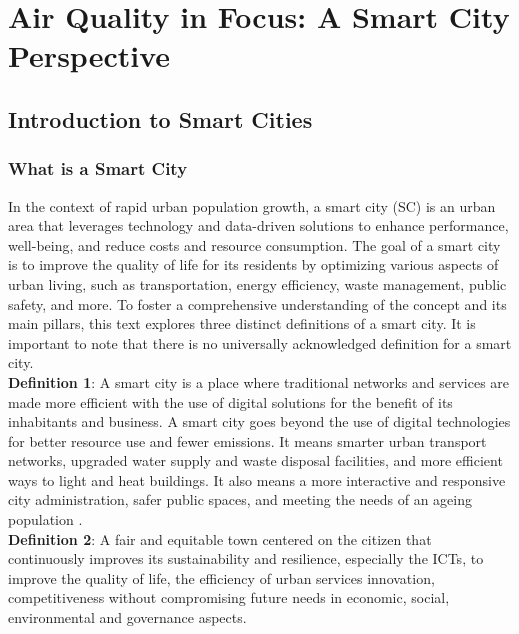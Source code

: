 \chapter{Air Quality in Focus: A Smart City Perspective}
\label{chap:OpenDatainSmartCities}

\section{Introduction to Smart Cities}
\label{sec:IntroductionSmartCities}

\subsection{What is a Smart City}

In the context of rapid urban population growth, a smart city (SC) is an urban area that leverages technology and data-driven solutions to enhance performance, well-being, and reduce costs and resource consumption. The goal of a smart city is to improve the quality of life for its residents by optimizing various aspects of urban living, such as transportation, energy efficiency, waste management, public safety, and more. 
To foster a comprehensive understanding of the concept and its main pillars, this text explores three distinct definitions of a smart city. It is important to note that there is no universally acknowledged definition for a smart city.
\\

\textbf{Definition 1}: A smart city is a place where traditional networks and services are made more efficient with the use of digital solutions for the benefit of its inhabitants and business. A smart city goes beyond the use of digital technologies for better resource use and fewer emissions. It means smarter urban transport networks, upgraded water supply and waste disposal facilities, and more efficient ways to light and heat buildings. It also means a more interactive and responsive city administration, safer public spaces, and meeting the needs of an ageing population \cite{foo1}.
\\

\textbf{Definition 2}: A fair and equitable town centered on the citizen that continuously improves its sustainability and resilience, especially the ICTs, to improve the quality of life, the efficiency of urban services innovation, competitiveness without compromising future needs in economic, social, environmental and governance aspects.
\\

